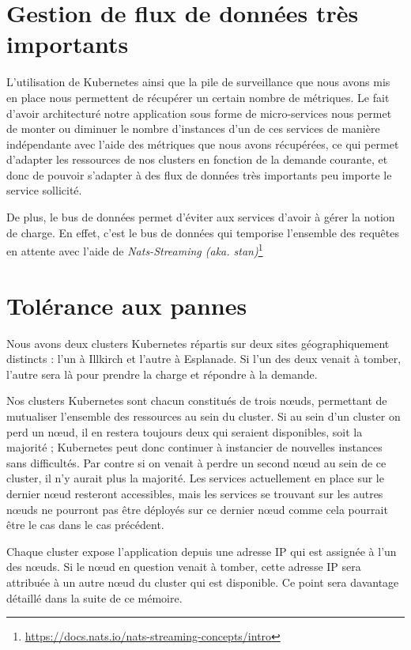\section{Gestion de flux de données très importants}

L'utilisation de Kubernetes ainsi que la pile de surveillance que nous
avons mis en place nous permettent de récupérer un certain nombre de
métriques. Le fait d'avoir architecturé notre application sous forme de
micro-services nous permet de monter ou diminuer le nombre d'instances
d'un de ces services de manière indépendante avec l'aide des métriques
que nous avons récupérées, ce qui permet d'adapter les ressources de nos
clusters en fonction de la demande courante, et donc de pouvoir
s'adapter à des flux de données très importants peu importe le service
sollicité.

De plus, le bus de données permet d'éviter aux services d'avoir à gérer
la notion de charge. En effet, c'est le bus de données qui temporise
l'ensemble des requêtes en attente avec l'aide de \textit{Nats-Streaming
(aka. stan)}\footnote{\url{https://docs.nats.io/nats-streaming-concepts/intro}}

\section{Tolérance aux pannes}

Nous avons deux clusters Kubernetes répartis sur deux sites
géographiquement distincts : l'un à Illkirch et l'autre à Esplanade. Si
l'un des deux venait à tomber, l'autre sera là pour prendre la charge et
répondre à la demande.

Nos clusters Kubernetes sont chacun constitués de trois nœuds,
permettant de mutualiser l'ensemble des ressources au sein du cluster.
Si au sein d'un cluster on perd un nœud, il en restera toujours deux qui
seraient disponibles, soit la majorité ; Kubernetes peut donc continuer
à instancier de nouvelles instances sans difficultés. Par contre si on
venait à perdre un second nœud au sein de ce cluster, il n'y aurait plus
la majorité. Les services actuellement en place sur le dernier nœud
resteront accessibles, mais les services se trouvant sur les autres
nœuds ne pourront pas être déployés sur ce dernier nœud comme cela
pourrait être le cas dans le cas précédent.

Chaque cluster expose l'application depuis une adresse IP qui est
assignée à l'un des nœuds. Si le nœud en question venait à tomber, cette
adresse IP sera attribuée à un autre nœud du cluster qui est disponible.
Ce point sera davantage détaillé dans la suite de ce mémoire.


